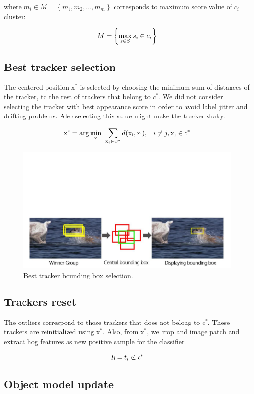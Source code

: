 where $m_i \in M = \left \{ m_1, m_2, ..., m_m \right \}$ corresponds to maximum score value of $c_i$ cluster:

\begin{equation}
\large
M =  \left \{ \max_{s\in S} s_i \in c_i \right \}
\end{equation}


\subsection{Best tracker selection}

The centered position $\mathrm{x}^{*}$ is selected by choosing the minimum sum of distances of the tracker, to the rest of trackers that belong to $c^{*}$. We did not consider selecting the tracker with best appearance score in order to avoid label jitter and drifting problems. Also selecting this value might make the tracker shaky.

\begin{equation}
\large
\mathrm{x}^{*} = \arg\min_{\mathrm{x}} ~\sum_{\mathrm{x}_{i} \in w^{*}}d(\mathrm{x_{i}}, \mathrm{x_{j}}) ,~~ i \neq j, \mathrm{x_{j}}\in c^{*}
\end{equation}

\begin{figure}[t!]
	\centering
		\includegraphics[width=0.95\linewidth, trim= 1cm 0cm 1cm 11cm, clip=true]{Figures/best_tracker.pdf}
	\caption{Best tracker bounding box selection.}
	\label{fig::best_tracker}
\end{figure}



\subsection{Trackers reset}

The outliers correspond to those trackers that does not belong to $c^*$. These trackers are reinitialized using $\mathrm{x}^{*}$. Also, from $\mathrm{x}^{*}$, we crop and image patch and extract hog features as new positive sample for the classifier.

\begin{equation}
\large
R = t_i \not\subset c^*
\end{equation}

\subsection{Object model update}
